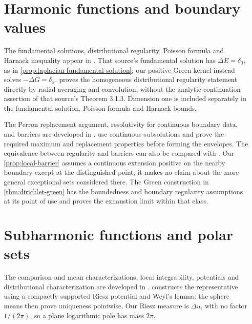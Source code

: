 \section{Harmonic functions and boundary values}
\label{sec:history-harmonic}
The fundamental solutions, distributional regularity, Poisson formula and Harnack inequality appear in \cite[Theorems 3.1.2--3.1.7, pp.~117--123]{Hor07}. That source's fundamental solution has $\Delta E=\delta_0$, as in \cref{prop:laplacian-fundamental-solution}; our positive Green kernel instead solves $-\Delta G=\delta_x$.  proves the homogeneous distributional regularity statement directly by radial averaging and convolution, without the analytic continuation assertion of that source's Theorem 3.1.3. Dimension one is included separately in the fundamental solution, Poisson formula and Harnack bounds.

The Perron replacement argument, resolutivity for continuous boundary data, and barriers are developed in \cite[Section 3.3, pp.~171--174, especially Theorem 3.3.3, Definition 3.3.4 and Theorem 3.3.5]{Hor07}.  use continuous subsolutions and prove the required maximum and replacement properties before forming the envelopes. The equivalence between regularity and barriers can also be compared with \cite[Theorem 3.4.17, pp.~219--220]{Hor07}. Our \cref{prop:local-barrier} assumes a continuous extension positive on the nearby boundary except at the distinguished point; it makes no claim about the more general exceptional sets considered there. The Green construction in \cref{thm:dirichlet-green} has the boundedness and boundary regularity assumptions at its point of use and proves the exhaustion limit within that class.

\section{Subharmonic functions and polar sets}
\label{sec:history-subharmonic}
The comparison and mean characterizations, local integrability, potentials and distributional characterization are developed in \cite[Theorem 3.2.3, Corollary 3.2.8 and Theorems 3.2.9--3.2.11, pp.~143--148]{Hor07}.  constructs the representative using a compactly supported Riesz potential and Weyl's lemma; the sphere means then prove uniqueness pointwise. Our Riesz measure is $\Delta u$, with no factor $1/(2\pi)$, so a plane logarithmic pole has mass $2\pi$.

